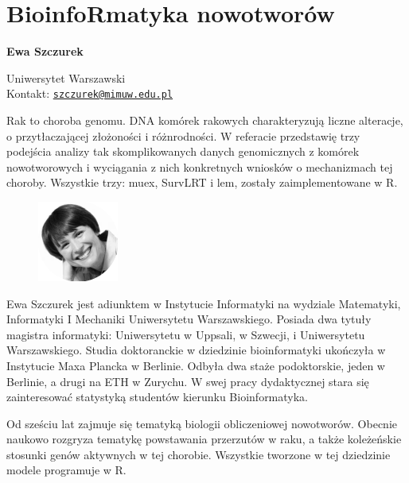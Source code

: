 \documentclass[\main/boa.tex]{subfiles}
\begin{document}
\section{BioinfoRmatyka nowotworów}


\begin{minipage}{0.915\textwidth}
	\centering
  {\bf \LARGE {} Ewa Szczurek}
\end{minipage}



\begin{affiliations}
\begin{minipage}{0.915\textwidth}
\centering
\large Uniwersytet Warszawski  \\[1pt]
Kontakt: \href{mailto:szczurek@mimuw.edu.pl}{\nolinkurl{szczurek@mimuw.edu.pl}}\\
\end{minipage}
\end{affiliations}


Rak to choroba genomu. DNA komórek rakowych charakteryzują liczne alteracje, o przytłaczającej złożoności i różnrodności. W referacie przedstawię trzy podejścia analizy tak skomplikowanych danych genomicznych z komórek nowotworowych i wyciągania z nich konkretnych wniosków o mechanizmach tej choroby. Wszystkie trzy: muex, SurvLRT i lem, zostały zaimplementowane w R. 

\bio
\begin{figure}
    \includegraphics[width=100px]{img/guests/czarno_biale/eszczurek-crop.png}
\end{figure} 
Ewa Szczurek jest adiunktem w Instytucie Informatyki na wydziale Matematyki, Informatyki I Mechaniki Uniwersytetu Warszawskiego. Posiada dwa tytuły magistra informatyki: Uniwersytetu w Uppsali, w Szwecji, i Uniwersytetu Warszawskiego. Studia doktoranckie w dziedzinie bioinformatyki ukończyła w Instytucie Maxa Plancka w Berlinie. Odbyła dwa staże podoktorskie, jeden w Berlinie, a drugi na ETH w Zurychu. W swej pracy dydaktycznej stara się zainteresować statystyką studentów kierunku Bioinformatyka.

Od sześciu lat zajmuje się tematyką biologii obliczeniowej nowotworów. Obecnie naukowo rozgryza tematykę powstawania przerzutów w raku, a także koleżeńskie stosunki genów aktywnych w tej chorobie. Wszystkie tworzone w tej dziedzinie modele programuje w R.
\end{document}
